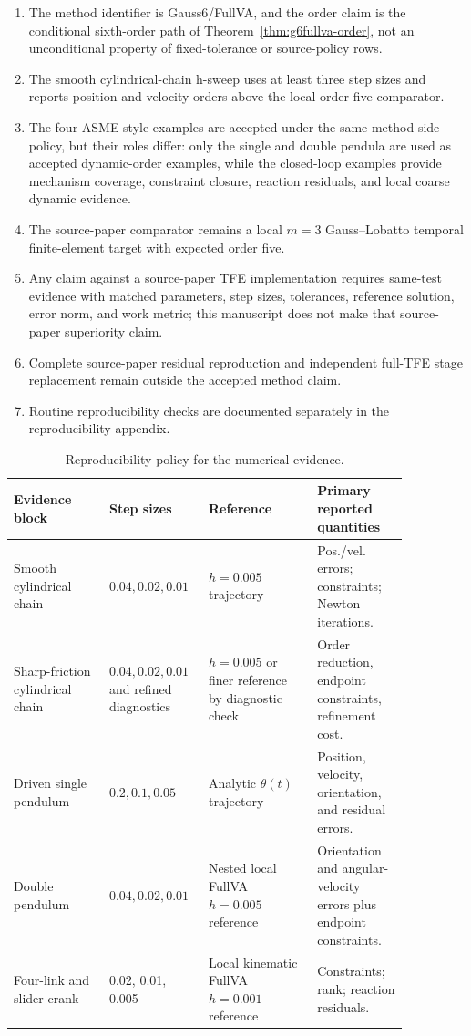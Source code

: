 \documentclass[preprint,12pt]{elsarticle}
\newcommand{\method}{Gauss6\slash FullVA}
\newcommand{\tfe}{TFE}
\begin{document}
\begin{enumerate}
  \item The method identifier is \method{}, and the order claim is the
  conditional sixth-order path of Theorem~\ref{thm:g6fullva-order}, not an
  unconditional property of fixed-tolerance or source-policy rows.
  \item The smooth cylindrical-chain h-sweep uses at least three step sizes and
  reports position and velocity orders above the local order-five comparator.
  \item The four ASME-style examples are accepted under the same method-side
  policy, but their roles differ: only the single and double pendula are used
  as accepted dynamic-order examples, while the closed-loop examples provide
  mechanism coverage, constraint closure, reaction residuals, and local coarse
  dynamic evidence.
  \item The source-paper comparator remains a local $m=3$ Gauss--Lobatto
  temporal finite-element target with expected order five.
  \item Any claim against a source-paper \tfe{} implementation requires
  same-test evidence with matched parameters, step sizes, tolerances,
  reference solution, error norm, and work metric; this manuscript does not
  make that source-paper superiority claim.
  \item Complete source-paper residual reproduction and independent
  full-\tfe{} stage replacement remain outside the accepted method claim.
  \item Routine reproducibility checks are documented separately in
  the reproducibility appendix.
\end{enumerate}

\begin{table}[htbp]
\centering
\caption{Reproducibility policy for the numerical evidence.}
\label{tab:experiment-policy}
\small
\begin{tabular}{P{0.22\linewidth}P{0.18\linewidth}P{0.25\linewidth}P{0.21\linewidth}}
\toprule
Evidence block & Step sizes & Reference & Primary reported quantities \\
\midrule
Smooth cylindrical chain &
$0.04,0.02,0.01$ &
$h=0.005$ trajectory &
Pos./vel. errors; constraints; Newton iterations. \\
Sharp-friction cylindrical chain &
$0.04,0.02,0.01$ and refined diagnostics &
$h=0.005$ or finer reference by diagnostic check &
Order reduction, endpoint constraints, refinement cost. \\
Driven single pendulum &
$0.2,0.1,0.05$ &
Analytic $\theta(t)$ trajectory &
Position, velocity, orientation, and residual errors. \\
Double pendulum &
$0.04,0.02,0.01$ &
Nested local FullVA $h=0.005$ reference &
Orientation and angular-velocity errors plus endpoint constraints. \\
Four-link and slider-crank &
0.02, 0.01, 0.005 &
Local kinematic FullVA $h=0.001$ reference &
Constraints; rank; reaction residuals. \\
\bottomrule
\end{tabular}
\end{table}
\end{document}
